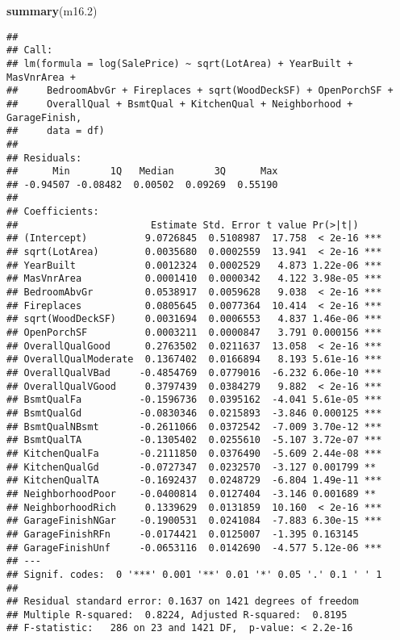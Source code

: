 \documentclass[
]{article}
\newenvironment{Shaded}{\begin{snugshade}}{\end{snugshade}}
\newcommand{\FloatTok}[1]{\textcolor[rgb]{0.00,0.00,0.81}{#1}}
\newcommand{\FunctionTok}[1]{\textcolor[rgb]{0.13,0.29,0.53}{\textbf{#1}}}
\newcommand{\NormalTok}[1]{#1}
\begin{document}
\begin{Shaded}
\begin{Highlighting}[]
\FunctionTok{summary}\NormalTok{(m16}\FloatTok{.2}\NormalTok{)}
\end{Highlighting}
\end{Shaded}

\begin{verbatim}
## 
## Call:
## lm(formula = log(SalePrice) ~ sqrt(LotArea) + YearBuilt + MasVnrArea + 
##     BedroomAbvGr + Fireplaces + sqrt(WoodDeckSF) + OpenPorchSF + 
##     OverallQual + BsmtQual + KitchenQual + Neighborhood + GarageFinish, 
##     data = df)
## 
## Residuals:
##      Min       1Q   Median       3Q      Max 
## -0.94507 -0.08482  0.00502  0.09269  0.55190 
## 
## Coefficients:
##                       Estimate Std. Error t value Pr(>|t|)    
## (Intercept)          9.0726845  0.5108987  17.758  < 2e-16 ***
## sqrt(LotArea)        0.0035680  0.0002559  13.941  < 2e-16 ***
## YearBuilt            0.0012324  0.0002529   4.873 1.22e-06 ***
## MasVnrArea           0.0001410  0.0000342   4.122 3.98e-05 ***
## BedroomAbvGr         0.0538917  0.0059628   9.038  < 2e-16 ***
## Fireplaces           0.0805645  0.0077364  10.414  < 2e-16 ***
## sqrt(WoodDeckSF)     0.0031694  0.0006553   4.837 1.46e-06 ***
## OpenPorchSF          0.0003211  0.0000847   3.791 0.000156 ***
## OverallQualGood      0.2763502  0.0211637  13.058  < 2e-16 ***
## OverallQualModerate  0.1367402  0.0166894   8.193 5.61e-16 ***
## OverallQualVBad     -0.4854769  0.0779016  -6.232 6.06e-10 ***
## OverallQualVGood     0.3797439  0.0384279   9.882  < 2e-16 ***
## BsmtQualFa          -0.1596736  0.0395162  -4.041 5.61e-05 ***
## BsmtQualGd          -0.0830346  0.0215893  -3.846 0.000125 ***
## BsmtQualNBsmt       -0.2611066  0.0372542  -7.009 3.70e-12 ***
## BsmtQualTA          -0.1305402  0.0255610  -5.107 3.72e-07 ***
## KitchenQualFa       -0.2111850  0.0376490  -5.609 2.44e-08 ***
## KitchenQualGd       -0.0727347  0.0232570  -3.127 0.001799 ** 
## KitchenQualTA       -0.1692437  0.0248729  -6.804 1.49e-11 ***
## NeighborhoodPoor    -0.0400814  0.0127404  -3.146 0.001689 ** 
## NeighborhoodRich     0.1339629  0.0131859  10.160  < 2e-16 ***
## GarageFinishNGar    -0.1900531  0.0241084  -7.883 6.30e-15 ***
## GarageFinishRFn     -0.0174421  0.0125007  -1.395 0.163145    
## GarageFinishUnf     -0.0653116  0.0142690  -4.577 5.12e-06 ***
## ---
## Signif. codes:  0 '***' 0.001 '**' 0.01 '*' 0.05 '.' 0.1 ' ' 1
## 
## Residual standard error: 0.1637 on 1421 degrees of freedom
## Multiple R-squared:  0.8224, Adjusted R-squared:  0.8195 
## F-statistic:   286 on 23 and 1421 DF,  p-value: < 2.2e-16
\end{verbatim}
\end{document}
